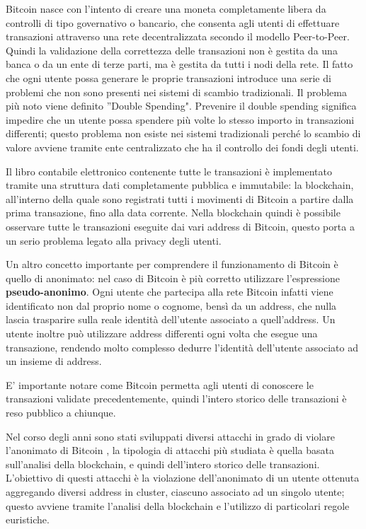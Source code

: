 Bitcoin nasce con l'intento di creare una moneta completamente libera da controlli di tipo governativo o bancario, che consenta agli utenti di effettuare transazioni attraverso una rete decentralizzata secondo il modello Peer-to-Peer. Quindi la validazione della correttezza delle transazioni non è gestita da una banca o da un ente di terze parti, ma è gestita da tutti i nodi della rete. Il fatto che ogni utente possa generare le proprie transazioni introduce una serie di problemi che non sono presenti nei sistemi di scambio tradizionali. Il problema più noto viene definito ''Double Spending". Prevenire il double spending significa impedire che un utente possa spendere più volte lo stesso importo in transazioni differenti; questo problema non esiste nei sistemi tradizionali perché lo scambio di valore avviene tramite ente centralizzato che ha il controllo dei fondi degli utenti. 

Il libro contabile elettronico contenente tutte le transazioni è implementato tramite una struttura dati completamente pubblica e immutabile: la blockchain, all’interno della quale sono registrati tutti i movimenti di Bitcoin a partire dalla prima transazione, fino alla data corrente. Nella blockchain quindi è possibile osservare tutte le transazioni eseguite dai vari address di Bitcoin, questo porta a un serio problema legato alla privacy degli utenti. 

Un altro concetto importante per comprendere il funzionamento di Bitcoin è quello di anonimato: nel caso di Bitcoin è più corretto utilizzare l’espressione \textbf{pseudo-anonimo}.
Ogni utente che partecipa alla rete Bitcoin infatti viene identificato non dal proprio nome o cognome, bensì da un address, che nulla lascia trasparire sulla reale identità dell'utente associato a quell'address. Un utente inoltre può utilizzare address differenti ogni volta che esegue una transazione, rendendo molto complesso dedurre l'identità dell'utente associato ad un insieme di address.

E' importante notare come Bitcoin permetta agli utenti di conoscere le transazioni validate precedentemente, quindi l'intero storico delle transazioni è reso pubblico a chiunque.

Nel corso degli anni sono stati sviluppati diversi attacchi in grado di violare l'anonimato di Bitcoin \cite{de-anonimizzazione}, la tipologia di attacchi più studiata è quella basata sull'analisi della blockchain, e quindi dell'intero storico delle transazioni. L'obiettivo di questi attacchi è la violazione dell'anonimato di un utente ottenuta aggregando diversi address in cluster, ciascuno associato ad un singolo utente; questo avviene tramite l'analisi della blockchain e l'utilizzo di particolari regole euristiche.

